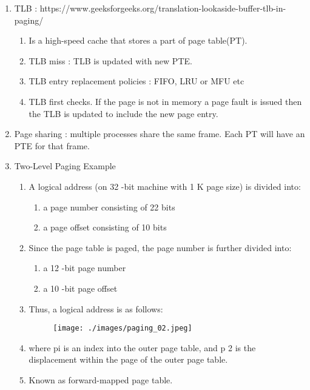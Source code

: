 \begin{enumerate}
  \item TLB : https://www.geeksforgeeks.org/translation-lookaside-buffer-tlb-in-paging/
    \begin{enumerate}
      \item Is a high-speed cache that stores a part of page table(PT).
      \item TLB miss : TLB is updated with new PTE.
      \item TLB entry replacement policies : FIFO, LRU or MFU etc
      \item TLB first checks. If the page is not in memory a page fault is issued then the TLB is updated to include the new page entry.
    \end{enumerate}

    \item Page sharing : multiple processes share the same  frame. Each PT will have an PTE for that frame.

  \item Two-Level Paging Example
  \begin{enumerate}
    \item  A logical address (on 32 -bit machine with 1 K page size) is divided into:
    \begin{enumerate}
      \item a page number consisting of 22 bits
      \item a page offset consisting of 10 bits
    \end{enumerate}
    \item Since the page table is paged, the page number is further divided into:
    \begin{enumerate}
        \item a 12 -bit page number
        \item a 10 -bit page offset
    \end{enumerate}
  \item Thus, a logical address is as follows:
    \begin{figure}[h]
        \centering   \texttt{[image: ./images/paging\_02.jpeg]}
    \end{figure}
  \item where pi is an index into the outer page table, and p 2 is the displacement within the page of the outer page table.
  \item Known as forward-mapped page table.
  \end{enumerate}

\end{enumerate}

